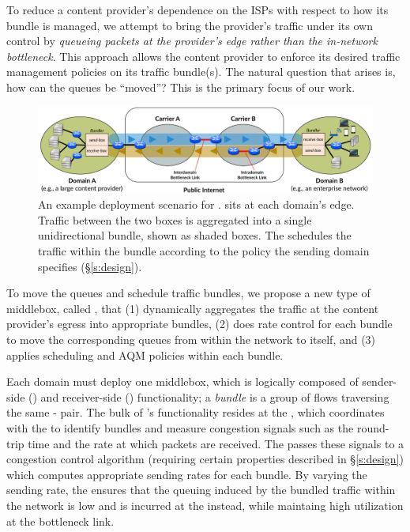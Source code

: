 To reduce a content provider's dependence on the ISPs with respect to how its bundle is managed, we attempt to bring the provider's traffic under its own control by \emph{queueing packets at the provider's edge rather than the in-network bottleneck}.
This approach allows the content provider to enforce its desired traffic management policies on its traffic bundle(s).
The natural question that arises is, how can the queues be ``moved''? This is the primary focus of our work. 

\begin{figure}[t]
    \centering
    \includegraphics[width=\textwidth]{img/deployment-arch.pdf}
    \caption{An example deployment scenario for \name. 
    \name sits at each domain's edge. Traffic between the two boxes is aggregated into a single unidirectional bundle, shown as shaded boxes. The \inbox schedules the traffic within the bundle according to the policy the sending domain specifies (\S\ref{s:design}).
    }\label{fig:deploy:arch}
\end{figure}

To move the queues and schedule traffic bundles, we propose a new type of middlebox, called \name, that (1) dynamically aggregates the traffic at the content provider's egress into appropriate bundles, (2) does rate control for each bundle to move the corresponding queues from within the network to itself, and (3) applies scheduling and AQM policies within each bundle. 

Each domain must deploy one middlebox, which is logically composed of sender-side (\inbox) and receiver-side (\outbox) functionality;
a \emph{bundle} is a group of flows traversing the same \inbox{}-\outbox{} pair.
The bulk of \name's functionality resides at the \inbox, which coordinates with the \outbox to identify bundles and measure congestion signals such as the round-trip time and the rate at which packets are received.
The \inbox passes these signals to a congestion control algorithm (requiring certain properties described in \S\ref{s:design}) which computes appropriate sending rates for each bundle. 
By varying the sending rate, the \inbox ensures that the queuing induced by the bundled traffic within the network is low and is incurred at the \inbox instead, while maintaing high utilization at the bottleneck link.
 

